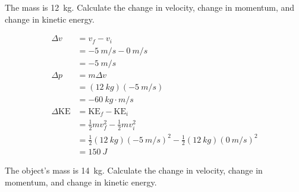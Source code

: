 \documentclass[]{exam}
\begin{document}
\begin{questions}
\ifprintanswers
    \clearpage
\fi

\clearpage
\question
The mass is \SI{12}{kg}. Calculate the change in velocity, change in momentum, and change in kinetic energy. 

\begin{center}
\end{center}


\begin{solution}
\begin{align*}
    \Delta v &= v_f - v_i \\[1ex]
    &= \SI{-5}{m/s} - \SI{0}{m/s} \\[1ex]
    &= \boxed{\SI{-5}{m/s}} \\[2ex]
    \Delta p &= m \Delta v \\[1ex]
    &= (\SI{12}{kg})(\SI{-5}{m/s}) \\[1ex]
    &= \boxed{\SI{-60}{kg\cdot m/s}} \\[2ex]
    \Delta \mathrm{KE} &= \mathrm{KE}_f - \mathrm{KE}_i \\[1ex]
    &= \frac{1}{2}m v_f^2 - \frac{1}{2}mv_i^2 \\[1ex]
    &= \frac{1}{2}(\SI{12}{kg})(\SI{-5}{m/s})^2 - \frac{1}{2}(\SI{12}{kg}) (\SI{0}{m/s})^2 \\[1ex]
    &= \boxed{\SI{150}{J}}
\end{align*}
\end{solution}

\ifprintanswers
    \clearpage
\fi

\question
The object's mass is \SI{14}{kg}. Calculate the change in velocity, change in momentum, and change in kinetic energy.

\begin{center}
\end{center}


\end{questions}
\end{document}
